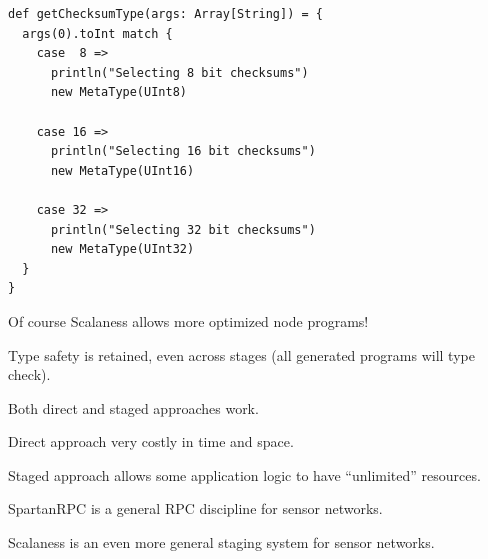 \begin{lstlisting}[language=scalaness]
def getChecksumType(args: Array[String]) = {
  args(0).toInt match {
    case  8 => 
      println("Selecting 8 bit checksums")   
      new MetaType(UInt8)
        
    case 16 =>
      println("Selecting 16 bit checksums") 
      new MetaType(UInt16)

    case 32 =>
      println("Selecting 32 bit checksums")
      new MetaType(UInt32)
  }
}
\end{lstlisting}
\stopslide

\begin{citemize}
\item Of course Scalaness allows more optimized node programs!
\item Type safety is retained, even across stages (all generated programs will type check).
\item {}
\end{citemize}
\stopslide

\begin{citemize}
\item Both direct and staged approaches  work.
\item Direct approach very costly in time and space.
\item Staged approach allows some application logic to have ``unlimited'' resources.
\item SpartanRPC is a general RPC discipline for sensor networks.
\item Scalaness is an even more general staging system for sensor networks.
\end{citemize}
\stopslide
